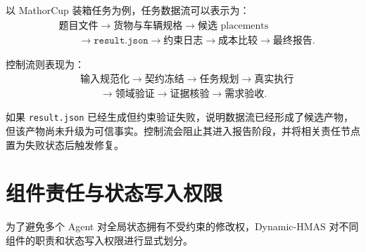\documentclass[UTF8,a4paper,12pt,oneside]{ctexbook}
\begin{document}
以 MathorCup 装箱任务为例，任务数据流可以表示为：
\[
\begin{aligned}
&\text{题目文件}
\rightarrow \text{货物与车辆规格}
\rightarrow \text{候选 placements} \\[3pt]
&\qquad\rightarrow \texttt{result.json}
\rightarrow \text{约束日志}
\rightarrow \text{成本比较}
\rightarrow \text{最终报告}.
\end{aligned}
\]

控制流则表现为：
\[
\begin{aligned}
&\text{输入规范化}
\rightarrow \text{契约冻结}
\rightarrow \text{任务规划}
\rightarrow \text{真实执行} \\[3pt]
&\qquad\rightarrow \text{领域验证}
\rightarrow \text{证据核验}
\rightarrow \text{需求验收}.
\end{aligned}
\]

如果 \texttt{result.json} 已经生成但约束验证失败，说明数据流已经形成了候选产物，但该产物尚未升级为可信事实。控制流会阻止其进入报告阶段，并将相关责任节点置为失败状态后触发修复。


\section{组件责任与状态写入权限}

为了避免多个 Agent 对全局状态拥有不受约束的修改权，Dynamic-HMAS 对不同组件的职责和状态写入权限进行显式划分。
\end{document}
